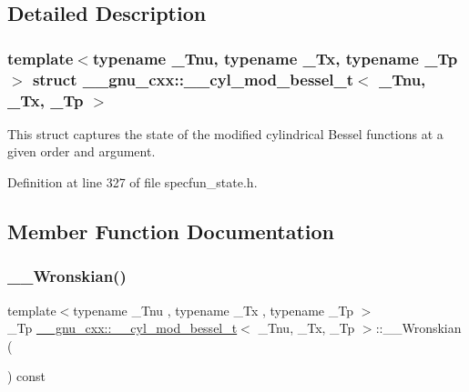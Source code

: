 \subsection{Detailed Description}
\subsubsection*{template$<$typename \+\_\+\+Tnu, typename \+\_\+\+Tx, typename \+\_\+\+Tp$>$\newline
struct \+\_\+\+\_\+gnu\+\_\+cxx\+::\+\_\+\+\_\+cyl\+\_\+mod\+\_\+bessel\+\_\+t$<$ \+\_\+\+Tnu, \+\_\+\+Tx, \+\_\+\+Tp $>$}

This struct captures the state of the modified cylindrical Bessel functions at a given order and argument. 

Definition at line 327 of file specfun\+\_\+state.\+h.



\subsection{Member Function Documentation}
\mbox{\label{struct____gnu__cxx_1_1____cyl__mod__bessel__t_a4e9bbc7f2cac91b245fda66b113fd5ac}} 
\subsubsection{\texorpdfstring{\+\_\+\+\_\+\+Wronskian()}{\_\_Wronskian()}}
{\footnotesize\ttfamily template$<$typename \+\_\+\+Tnu , typename \+\_\+\+Tx , typename \+\_\+\+Tp $>$ \\
\+\_\+\+Tp \hyperlink{struct____gnu__cxx_1_1____cyl__mod__bessel__t}{\+\_\+\+\_\+gnu\+\_\+cxx\+::\+\_\+\+\_\+cyl\+\_\+mod\+\_\+bessel\+\_\+t}$<$ \+\_\+\+Tnu, \+\_\+\+Tx, \+\_\+\+Tp $>$\+::\+\_\+\+\_\+\+Wronskian (\begin{DoxyParamCaption}{ }\end{DoxyParamCaption}) const\hspace{0.3cm}{\ttfamily [inline]}}



